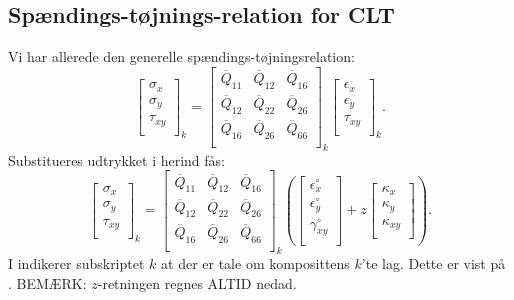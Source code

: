 \subsection{Spændings-tøjnings-relation for CLT}
Vi har allerede den generelle spændings-tøjningsrelation:
\begin{equation*}
  \begin{bmatrix}
    \sigma_x\\
  \sigma_y\\
  \tau_{xy}\\
  \end{bmatrix}_k = \begin{bmatrix}
    \overline{Q}_{11} & \overline{Q}_{12} & \overline{Q}_{16}\\
  \overline{Q}_{12} & \overline{Q}_{22} & \overline{Q}_{26}\\
  \overline{Q}_{16} & \overline{Q}_{26} & \overline{Q}_{66}\\
  \end{bmatrix}_k \begin{bmatrix}
    \epsilon_x\\
  \epsilon_y\\
  \tau_{xy}\\
  \end{bmatrix}_k
.\end{equation*}
Substitueres udtrykket i  herind fås:
\begin{equation} \label{eq:spændingstøjningsclt}
  \begin{bmatrix}
    \sigma_{x}\\
  \sigma_y\\
  \tau_{xy}\\
  \end{bmatrix}_k = \begin{bmatrix}
    \overline{Q}_{11} & \overline{Q}_{12} & \overline{Q}_{16}\\
  \overline{Q}_{12} & \overline{Q}_{22} & \overline{Q}_{26}\\
  \overline{Q}_{16} & \overline{Q}_{26} & \overline{Q}_{66}\\
  \end{bmatrix}_k \left( \begin{bmatrix}
    \epsilon_{x}^{\circ}\\
  \epsilon_y^{\circ}\\
  \gamma_{xy}^{\circ}\\
  \end{bmatrix} + z \begin{bmatrix}
    \kappa_x\\
  \kappa_y\\
  \kappa_{xy}\\
  \end{bmatrix} \right)
.\end{equation}
I  indikerer subskriptet $k$ at der er tale om komposittens $k$'te lag.
Dette er vist på . BEMÆRK: $z$-retningen regnes ALTID nedad.

